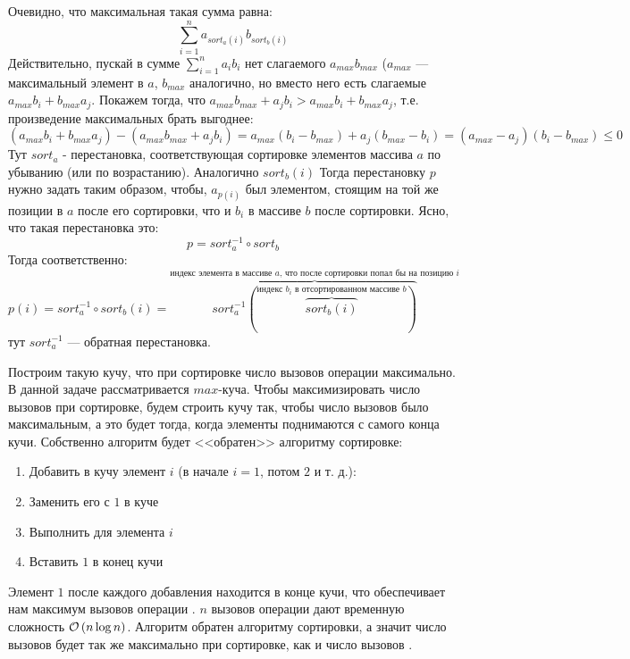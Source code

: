 Очевидно, что максимальная такая сумма равна:
\[\sum_{i=1}^{n}{a_{sort_a(i)}b_{sort_b(i)}}\]
Действительно, пускай в сумме $\sum_{i=1}^{n}{a_ib_i}$ нет слагаемого $a_{max}b_{max}$ ($a_{max}$ --- максимальный элемент в $a$, $b_{max}$ аналогично, но вместо него есть слагаемые $a_{max}b_i + b_{max}a_j$. Покажем тогда, что $a_{max}b_{max}+a_jb_i > a_{max}b_i + b_{max}a_j$, т.е. произведение максимальных брать выгоднее:
\[
	(a_{max}b_i+b_{max}a_j)-(a_{max}b_{max}+a_jb_i) = a_{max}(b_i-b_{max}) + a_j(b_{max}-b_i) = 
	  (a_{max}-a_j)(b_i-b_{max}) \leq 0 
\]
Тут $sort_a$ - перестановка, соответствующая сортировке элементов массива $a$ по убыванию (или по возрастанию). Аналогично $sort_b(i)$
Тогда перестановку $p$ нужно задать таким образом, чтобы, $a_{p(i)}$ был элементом, стоящим на той же позиции в $a$ после его сортировки, что и $b_i$ в массиве $b$ после сортировки. Ясно, что такая перестановка это:
\[p = sort_a^{-1}\circ sort_b\]
Тогда соответственно:
\[p(i) = sort_a^{-1}\circ sort_b(i) = \overbrace{sort_a^{-1}(\overbrace{sort_b(i)}^{\text{индекс } b_i\text{ в отсортированном массиве } b})}^{\text{индекс элемента в массиве } a \text{, что после сортировки попал бы на позицию } i}\]
тут $sort_a^{-1}$ --- обратная перестановка. \xqed

Построим такую кучу, что при сортировке число вызовов операции  максимально. В данной задаче рассматривается $max$-куча.
Чтобы максимизировать число вызовов  при сортировке, будем строить кучу так, чтобы число вызовов  было максимальным, а это будет тогда, когда элементы поднимаются с самого конца кучи. Собственно алгоритм будет <<обратен>> алгоритму сортировке:
\begin{enumerate}
\item Добавить в кучу элемент $i$ (в начале $i = 1$, потом $2$ и т. д.):
\item Заменить его с $1$ в куче
\item Выполнить для элемента $i$ 
\item Вставить $1$ в конец кучи
\end{enumerate}
Элемент $1$ после каждого добавления находится в конце кучи, что обеспечивает нам максимум вызовов операции .
$n$ вызовов операции  дают временную сложность $\mathcal{O}\left(n\log{n}\right)$.
Алгоритм обратен алгоритму сортировки, а значит число вызовов  будет так же максимально при сортировке, как и число вызовов . \xqed
